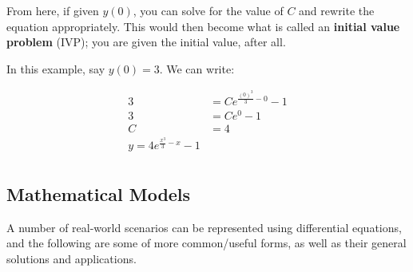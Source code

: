 \documentclass[12pt]{article}
\begin{document}
From here, if given $y(0)$, you can solve for the value of $C$ and rewrite the equation appropriately. This would then become what is called an \textbf{initial value problem} (IVP); you are given the initial value, after all. 

In this example, say $y(0) = 3$. We can write:

\begin{equation}
    \begin{split}
        3 &= Ce^{\frac{(0)^3}{3}-0}-1\\
        3 &= Ce^0-1\\
        C &= 4\\
        y = 4e^{\frac{x^3}{3}-x}-1\\
    \end{split}
\end{equation}

\subsection{Mathematical Models}

A number of real-world scenarios can be represented using differential equations, and the following are some of more common/useful forms, as well as their general solutions and applications.
\end{document}
